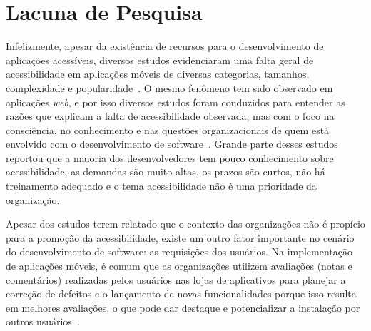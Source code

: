 


\section{Lacuna de Pesquisa}

Infelizmente, 
apesar da existência de recursos para o desenvolvimento de aplicações acessíveis, 
diversos estudos evidenciaram uma falta geral de acessibilidade em aplicações móveis de diversas categorias, tamanhos, complexidade e popularidade~\cite{serra2015accessibility,eler2018mate,Yan2019currentstatus,Vendome2019,Alshayban2020,AcostaVargas2020}.
O mesmo fenômeno tem sido observado em aplicações \textit{web}, e por isso diversos estudos foram conduzidos para entender as razões que explicam a falta de acessibilidade observada, mas com o foco na consciência, no conhecimento e nas questões organizacionais de quem está envolvido com o desenvolvimento de software~\cite{  
lazar2004improving,Freire2008survey,oliveira2017strategies,Inal2019,barzilai2008factors,Putnam:2012}. 
Grande parte desses estudos reportou que a maioria dos desenvolvedores tem pouco conhecimento sobre acessibilidade, as demandas são muito altas, os prazos são curtos, não há treinamento adequado e o tema acessibilidade não é uma prioridade da organização.

Apesar dos estudos terem relatado que o contexto das organizações não é propício para a promoção da acessibilidade, existe um outro fator importante no cenário do desenvolvimento de software: as requisições dos usuários. 
Na implementação de aplicações móveis, 
é comum que as organizações utilizem avaliações (notas e comentários) realizadas pelos usuários nas lojas de aplicativos para planejar a correção de defeitos e o lançamento de novas funcionalidades porque isso resulta em melhores avaliações, o que pode dar destaque e potencializar a instalação por outros usuários~\cite{nayebi,Palomba2015userreviews,Palomba2018crowdsourcing,Li2018MobileAE,Ciurumelea2017analyzing,Ortega2015thesis}.

